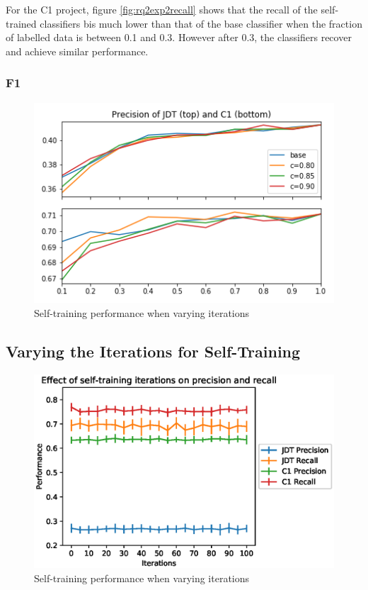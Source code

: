 \documentclass[../main.tex]{subfiles}
\begin{document}
For the C1 project, figure \ref{fig:rq2exp2recall} shows that the recall of the self-trained classifiers bis much lower than that of the base classifier when the fraction of labelled data is between 0.1 and 0.3. However after 0.3, the classifiers recover and achieve similar performance. 

\subsubsection{F1}

\begin{figure}[H]
    \centering
    \includegraphics[scale=0.8]{images/Results/RQ1/rq1exp2_F1.png}
    \caption{Self-training performance when varying iterations}
    \label{fig:rq2exp2f1}
\end{figure}

\subsection{Varying the Iterations for Self-Training}

\begin{figure}[H]
    \centering
    \includegraphics[scale=0.8]{Experiment_3.eps}
    \caption{Self-training performance when varying iterations}
    \label{fig:rq1exp3}
\end{figure}
\end{document}
